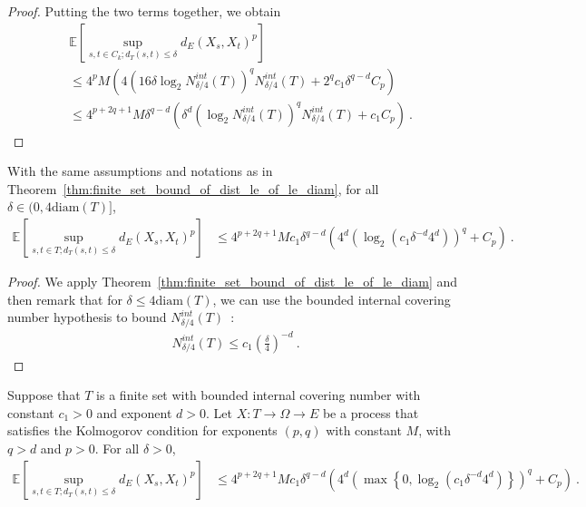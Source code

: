 \begin{proof}
Putting the two terms together, we obtain
\begin{align*}
  &\mathbb{E}\left[ \sup_{s, t \in C_k; d_T(s, t) \le \delta} d_E(X_s, X_t)^p \right]
  \\
  &\le 4^p M \left(4\left(16 \delta \log_2 N^{int}_{\delta/4}(T) \right)^q  N^{int}_{\delta/4}(T)
    + 2^q c_1 \delta^{q - d} C_p\right)
  \\
  &\le 4^{p+2q+1} M \delta^{q-d} \left(\delta^d \left(\log_2 N^{int}_{\delta/4}(T) \right)^q  N^{int}_{\delta/4}(T)
    + c_1 C_p\right)
  \: .
\end{align*}
\end{proof}


\begin{corollary}\label{cor:finite_set_bound_of_dist_le_of_le_diam_bis}
  \leanok
With the same assumptions and notations as in Theorem~\ref{thm:finite_set_bound_of_dist_le_of_le_diam}, for all $\delta \in (0, 4\mathrm{diam}(T)]$,
\begin{align*}
  \mathbb{E}\left[ \sup_{s, t \in T; d_T(s, t) \le \delta} d_E(X_s, X_t)^p \right]
  &\le 4^{p+2q+1} M c_1 \delta^{q-d} \left(4^d \left(\log_2 \left(c_1 \delta^{-d} 4^d \right) \right)^q
    + C_p\right)
  \: .
\end{align*}
\end{corollary}

\begin{proof}
We apply Theorem~\ref{thm:finite_set_bound_of_dist_le_of_le_diam} and then remark that for $\delta \le 4\mathrm{diam}(T)$, we can use the bounded internal covering number hypothesis to bound $N^{int}_{\delta/4}(T)$~:
\begin{align*}
  N^{int}_{\delta/4}(T) \le c_1 \left(\frac{\delta}{4}\right)^{-d} \: .
\end{align*}
\end{proof}


\begin{corollary}\label{cor:finite_set_bound_of_dist_le}
  \leanok
Suppose that $T$ is a finite set with bounded internal covering number with constant $c_1>0$ and exponent $d > 0$.
Let $X : T \to \Omega \to E$ be a process that satisfies the Kolmogorov condition for exponents $(p,q)$ with constant $M$, with $q > d$ and $p > 0$.
For all $\delta > 0$,
\begin{align*}
  \mathbb{E}\left[ \sup_{s, t \in T; d_T(s, t) \le \delta} d_E(X_s, X_t)^p \right]
  &\le 4^{p+2q+1} M c_1 \delta^{q-d} \left(4^d \left(\max\left\{0, \log_2 \left(c_1 \delta^{-d} 4^d\right) \right\} \right)^q
    + C_p\right)
  \: .
\end{align*}
\end{corollary}


